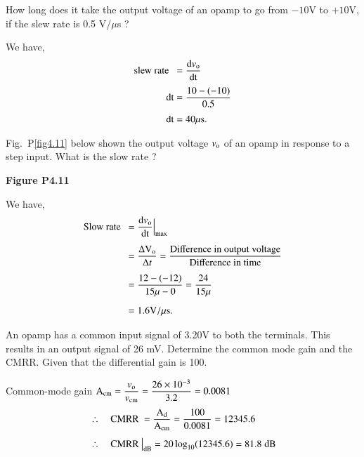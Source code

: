 \begin{problem}\label{prob4.9}
How long does it take the output voltage of an opamp to go from $-10$V to $+10$V, if the slew rate is 0.5 V/$\mu$s ?
\end{problem}

\begin{solution}
We have,
\begin{align*}
\text{slew rate~~} &= \frac{\text{d}v_{\textrm{o}}}{\operatorname{dt}}\\[3pt]
 \operatorname{dt} &= \frac{10-(-10)}{0.5}\\[3pt]
\operatorname{dt} &= 40 \mu \text{s}.
\end{align*}
\end{solution}

\begin{problem}\label{prob4.10}
Fig.~P\ref{fig4.11} below shown the output voltage $v_{\textrm{o}}$ of an opamp in response to a step input. What is the slow rate ?
\begin{center}
{\bf Figure P4.11}
\end{center}
\end{problem}

\begin{solution}
We have,
\begin{align*}
\text{Slow rate~~} &= \dfrac{\text{d}v_{\textrm{o}}}{\operatorname{dt}}\Big|_{\max}\\[5pt]
&= \frac{\Delta \textrm{V}_{\textrm{o}}}{\Delta t}=\frac{\text{Difference in output voltage}}{\text{Difference in time}}\\[5pt]
&= \frac{12-(-12)}{15\mu -0}=\frac{24}{15\mu}\\[5pt]
&= 1.6 \textrm{V}/\mu \text{s}.
\end{align*}
\end{solution}

\begin{problem}\label{prob4.11}
An opamp has a common input signal of 3.20V to both the terminals. This results in an output signal of 26 mV. Determine the common mode gain and the CMRR. Given that the differential gain is 100.
\end{problem}

\begin{solution}
Common-mode gain $\textrm{A}_{\text{cm}}=\dfrac{v_{\textrm{o}}}{v_{\text{cm}}}=\dfrac{26\times 10^{-3}}{3.2}=0.0081$
\begin{align*}
&\therefore\quad \text{CMRR~} = \frac{\textrm{A}_{\text{d}}}{\textrm{A}_{\text{cm}}}=\frac{100}{0.0081}=12345.6\\[4pt]
&\therefore\quad \text{CMRR~}\big|_{\text{dB}}=20\log_{10}(12345.6)=81.8\;\text{dB}
\end{align*}
\end{solution}

